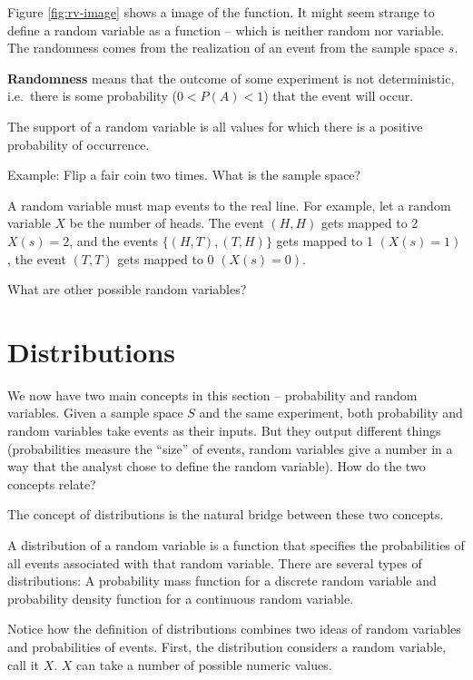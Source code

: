 \documentclass[]{book}
\theoremstyle{definition}
\theoremstyle{definition}
\theoremstyle{definition}
\theoremstyle{remark}
\let\BeginKnitrBlock\begin \let\EndKnitrBlock\end
\begin{document}
Figure \ref{fig:rv-image} shows a image of the function. It might seem
strange to define a random variable as a function -- which is neither
random nor variable. The randomness comes from the realization of an
event from the sample space \(s\).

\textbf{Randomness} means that the outcome of some experiment is not
deterministic, i.e.~there is some probability (\(0 < P(A) < 1\)) that
the event will occur.

The support of a random variable is all values for which there is a
positive probability of occurrence.

Example: Flip a fair coin two times. What is the sample space?

A random variable must map events to the real line. For example, let a
random variable \(X\) be the number of heads. The event \((H, H)\) gets
mapped to 2 \(X(s) = 2\), and the events \(\{(H, T), (T, H)\}\) gets
mapped to 1 \((X(s) = 1)\), the event \((T, T)\) gets mapped to 0
\((X(s) = 0)\).

What are other possible random variables?

\section{Distributions}\label{distributions}

We now have two main concepts in this section -- probability and random
variables. Given a sample space \(S\) and the same experiment, both
probability and random variables take events as their inputs. But they
output different things (probabilities measure the ``size'' of events,
random variables give a number in a way that the analyst chose to define
the random variable). How do the two concepts relate?

The concept of distributions is the natural bridge between these two
concepts.

\BeginKnitrBlock{definition}[Distribution of a random variable]
\protect\hypertarget{def:unnamed-chunk-72}{}{\label{def:unnamed-chunk-72}
{} }A distribution of a
random variable is a function that specifies the probabilities of all
events associated with that random variable. There are several types of
distributions: A probability mass function for a discrete random
variable and probability density function for a continuous random
variable.
\EndKnitrBlock{definition}

Notice how the definition of distributions combines two ideas of random
variables and probabilities of events. First, the distribution considers
a random variable, call it \(X\). \(X\) can take a number of possible
numeric values.
\end{document}
